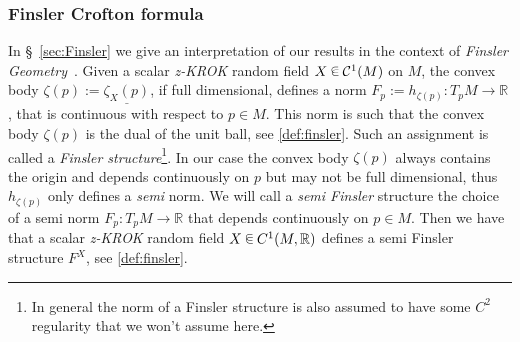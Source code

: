 \documentclass[10pt]{amsart}
\theoremstyle{definition}\newtheorem{defi}[theo]{Definition}\newtheorem{rema}[theo]{Remark}\newtheorem{exam}[theo]{Example}\newtheorem{exem}[theo]{Example}\newtheorem{nota}[theo]{Notation}
\newcommand{\R}{\mathbb{R}}
\newcommand{\mC}{\mathcal{C}}
\newcommand{\seg}{\underline}
\newcommand{\zkrok}{\emph{z-KROK}\xspace}
\newcommand*\randin{
\mathchoice {\raisebox{-.35ex}{$\displaystyle{^\subset}$}\mkern-11.5mu\raisebox{+.45ex}{$\displaystyle{_\subset}$}} {\mkern+1mu\raisebox{-.27ex}{$\textstyle{^\subset}$}\mkern-11.7mu\raisebox{+.45ex}{$\textstyle{_\subset}$}} {\raisebox{.35ex}{$\scriptstyle\subset$}\mkern-14mu\raisebox{-.15ex}{$\scriptstyle\subset$}} {\raisebox{.3ex}{$\scriptscriptstyle\subset$}\mkern-13.5mu\raisebox{-.10ex}{$\scriptscriptstyle\subset$}}}
\begin{document}
\subsubsection{Finsler Crofton formula}

In \S~\ref{sec:Finsler} we give an interpretation of our results in the context of \emph{Finsler Geometry}~\cite{introRiemannFinsler}. Given a scalar \zkrok random field $X\,\randin\, \mC^1(M)$ on $M$, the convex body $\zeta(p):=\seg{\zeta_X(p)}$, if full dimensional, defines a norm $F_p:=h_{\zeta(p)}:T_pM\to\R$, that is continuous with respect to $p\in M$. This norm is such that the convex body $\zeta(p)$ is the dual of the unit ball, see \cref{def:finsler}. Such an assignment is called a \emph{Finsler structure}\footnote{In general the norm of a Finsler structure is also assumed to have some $C^2$ regularity that we won't assume here.}. In our case the convex body $\zeta(p)$ always contains the origin and depends continuously on $p$ but may not be full dimensional, thus $h_{\zeta(p)}$ only defines a \emph{semi} norm. We will call a \emph{semi Finsler} structure the choice of a semi norm $F_p:T_pM\to\R$ that depends continuously on $p\in M$. Then we have that a scalar \zkrok random field $X\,\randin\, C^1(M,\R)$ defines a semi Finsler structure $F^X$, see \cref{def:finsler}.
\end{document}
